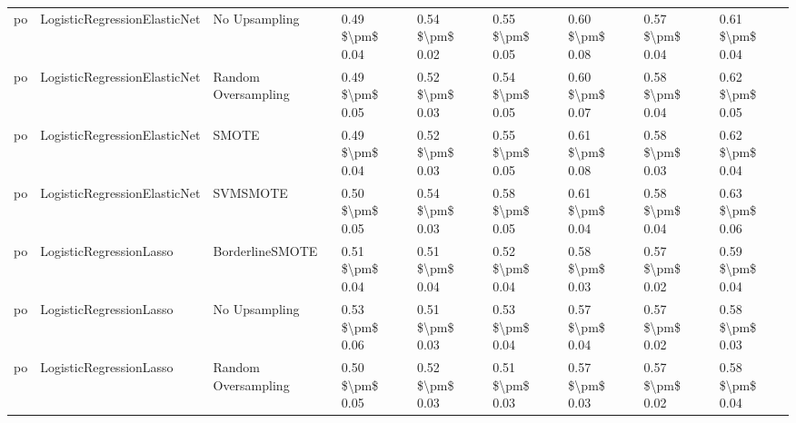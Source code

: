 \begin{tabular}{lllllllll}
      po &    LogisticRegressionElasticNet &                 No Upsampling & 0.49 \$\textbackslash pm\$ 0.04 &           0.54 \$\textbackslash pm\$ 0.02 &       0.55 \$\textbackslash pm\$ 0.05 &        0.60 \$\textbackslash pm\$ 0.08 &                         0.57 \$\textbackslash pm\$ 0.04 &     0.61 \$\textbackslash pm\$ 0.04 \\
      po &    LogisticRegressionElasticNet &           Random Oversampling & 0.49 \$\textbackslash pm\$ 0.05 &           0.52 \$\textbackslash pm\$ 0.03 &       0.54 \$\textbackslash pm\$ 0.05 &        0.60 \$\textbackslash pm\$ 0.07 &                         0.58 \$\textbackslash pm\$ 0.04 &     0.62 \$\textbackslash pm\$ 0.05 \\
      po &    LogisticRegressionElasticNet &                         SMOTE & 0.49 \$\textbackslash pm\$ 0.04 &           0.52 \$\textbackslash pm\$ 0.03 &       0.55 \$\textbackslash pm\$ 0.05 &        0.61 \$\textbackslash pm\$ 0.08 &                         0.58 \$\textbackslash pm\$ 0.03 &     0.62 \$\textbackslash pm\$ 0.04 \\
      po &    LogisticRegressionElasticNet &                      SVMSMOTE & 0.50 \$\textbackslash pm\$ 0.05 &           0.54 \$\textbackslash pm\$ 0.03 &       0.58 \$\textbackslash pm\$ 0.05 &        0.61 \$\textbackslash pm\$ 0.04 &                         0.58 \$\textbackslash pm\$ 0.04 &     0.63 \$\textbackslash pm\$ 0.06 \\
      po &         LogisticRegressionLasso &               BorderlineSMOTE & 0.51 \$\textbackslash pm\$ 0.04 &           0.51 \$\textbackslash pm\$ 0.04 &       0.52 \$\textbackslash pm\$ 0.04 &        0.58 \$\textbackslash pm\$ 0.03 &                         0.57 \$\textbackslash pm\$ 0.02 &     0.59 \$\textbackslash pm\$ 0.04 \\
      po &         LogisticRegressionLasso &                 No Upsampling & 0.53 \$\textbackslash pm\$ 0.06 &           0.51 \$\textbackslash pm\$ 0.03 &       0.53 \$\textbackslash pm\$ 0.04 &        0.57 \$\textbackslash pm\$ 0.04 &                         0.57 \$\textbackslash pm\$ 0.02 &     0.58 \$\textbackslash pm\$ 0.03 \\
      po &         LogisticRegressionLasso &           Random Oversampling & 0.50 \$\textbackslash pm\$ 0.05 &           0.52 \$\textbackslash pm\$ 0.03 &       0.51 \$\textbackslash pm\$ 0.03 &        0.57 \$\textbackslash pm\$ 0.03 &                         0.57 \$\textbackslash pm\$ 0.02 &     0.58 \$\textbackslash pm\$ 0.04 \\

\end{tabular}

